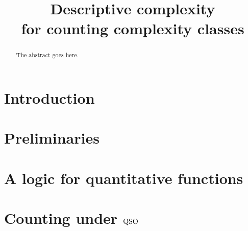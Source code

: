 \documentclass[conference]{IEEEtran}
\begin{document}
\title{Descriptive complexity \\
	for counting complexity classes}


\author{
\and
{}
\and
{}
}

\maketitle


\begin{abstract}
The abstract goes here.
\end{abstract}

\IEEEpeerreviewmaketitle

\section{Introduction}


\section{Preliminaries} \label{sec:preliminaries}


\section{A logic for quantitative functions} \label{sec:logic}


\section{Counting under ${\rm QSO}$} \label{sec:complexity}

\end{document}
